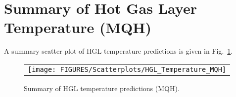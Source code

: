 \clearpage


\section{Summary of Hot Gas Layer Temperature (MQH)}

A summary scatter plot of HGL temperature predictions is given in Fig.~\ref{hgl_temperature_MQH_summary}. 

\begin{figure}[ht]
\begin{center}
\begin{tabular}{l}
\texttt{[image: FIGURES/Scatterplots/HGL\_Temperature\_MQH]}
\end{tabular}
\end{center}
\caption[Summary of HGL temperature predictions (MQH).]
{Summary of HGL temperature predictions (MQH).}
\label{hgl_temperature_MQH_summary}
\end{figure}



